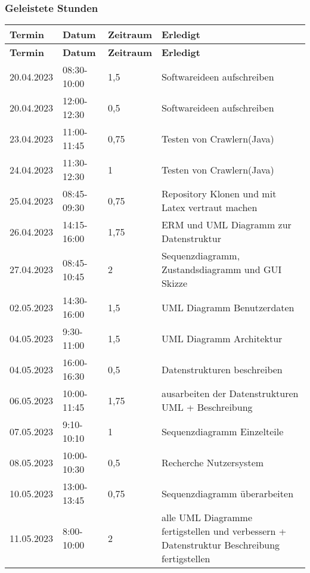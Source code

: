 \subsubsection{Geleistete Stunden}
\begin{flushleft}
		\begin{longtable}{p{2cm}p{}p{2cm}p{}}
            \toprule
            \textbf{Termin} & \textbf{Datum} & \textbf{Zeitraum} & \textbf{Erledigt}\\
            \midrule\endfirsthead
            \toprule
            \textbf{Termin} & \textbf{Datum} & \textbf{Zeitraum} & \textbf{Erledigt}\\
            \midrule\endhead
            	20.04.2023 & 08:30-10:00 & 1,5 & Softwareideen aufschreiben\\ \midrule
    			20.04.2023 & 12:00-12:30 & 0,5 & Softwareideen aufschreiben\\ \midrule
    			23.04.2023 & 11:00-11:45 & 0,75 & Testen von Crawlern(Java)\\ \midrule
    			24.04.2023 & 11:30-12:30 & 1 & Testen von Crawlern(Java)\\ \midrule
    			25.04.2023 & 08:45-09:30 & 0,75 & Repository Klonen und mit Latex vertraut machen\\ \midrule
    			26.04.2023 & 14:15-16:00 & 1,75 & ERM und UML Diagramm zur Datenstruktur\\ \midrule
    			27.04.2023 & 08:45-10:45 & 2 & Sequenzdiagramm, Zustandsdiagramm und GUI Skizze\\
    			02.05.2023 & 14:30-16:00 & 1,5 & UML Diagramm Benutzerdaten\\ \midrule
    			04.05.2023 & 9:30-11:00 & 1,5 & UML Diagramm Architektur\\ \midrule
    			04.05.2023 & 16:00-16:30& 0,5 & Datenstrukturen beschreiben\\ \midrule
    			06.05.2023 & 10:00-11:45 & 1,75 & ausarbeiten der Datenstrukturen UML + Beschreibung \\ \midrule
    			07.05.2023 & 9:10-10:10 & 1 & Sequenzdiagramm Einzelteile\\ \midrule
    			08.05.2023 & 10:00-10:30 & 0,5 & Recherche Nutzersystem\\ \midrule
    			10.05.2023 & 13:00-13:45 & 0,75 & Sequenzdiagramm überarbeiten\\ \midrule
    			11.05.2023 & 8:00-10:00 & 2 & alle UML Diagramme fertigstellen und verbessern + 	Datenstruktur Beschreibung fertigstellen\\ \midrule

\end{longtable}
\end{flushleft}
